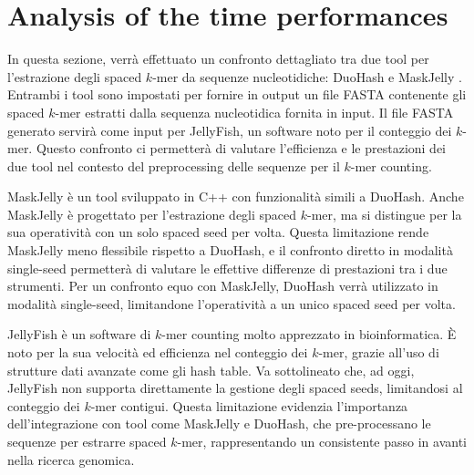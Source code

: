 \section{Analysis of the time performances}
\label{sec:performances}

In questa sezione, verrà effettuato un confronto dettagliato tra due tool per l'estrazione degli spaced $k$-mer da sequenze nucleotidiche: DuoHash e MaskJelly \cite{ebler2022pangenome}. Entrambi i tool sono impostati per fornire in output un file FASTA contenente gli spaced $k$-mer estratti dalla sequenza nucleotidica fornita in input. Il file FASTA generato servirà come input per JellyFish, un software noto per il conteggio dei $k$-mer. Questo confronto ci permetterà di valutare l'efficienza e le prestazioni dei due tool nel contesto del preprocessing delle sequenze per il $k$-mer counting.

MaskJelly è un tool sviluppato in C++ con funzionalità simili a DuoHash. Anche MaskJelly è progettato per l'estrazione degli spaced $k$-mer, ma si distingue per la sua operatività con un solo spaced seed per volta. Questa limitazione rende MaskJelly meno flessibile rispetto a DuoHash, e il confronto diretto in modalità single-seed permetterà di valutare le effettive differenze di prestazioni tra i due strumenti. Per un confronto equo con MaskJelly, DuoHash verrà utilizzato in modalità single-seed, limitandone l'operatività a un unico spaced seed per volta.

JellyFish è un software di $k$-mer counting molto apprezzato in bioinformatica. È noto per la sua velocità ed efficienza nel conteggio dei $k$-mer, grazie all'uso di strutture dati avanzate come gli hash table. Va sottolineato che, ad oggi, JellyFish non supporta direttamente la gestione degli spaced seeds, limitandosi al conteggio dei $k$-mer contigui. Questa limitazione evidenzia l'importanza dell'integrazione con tool come MaskJelly e DuoHash, che pre-processano le sequenze per estrarre spaced $k$-mer, rappresentando un consistente passo in avanti nella ricerca genomica.


